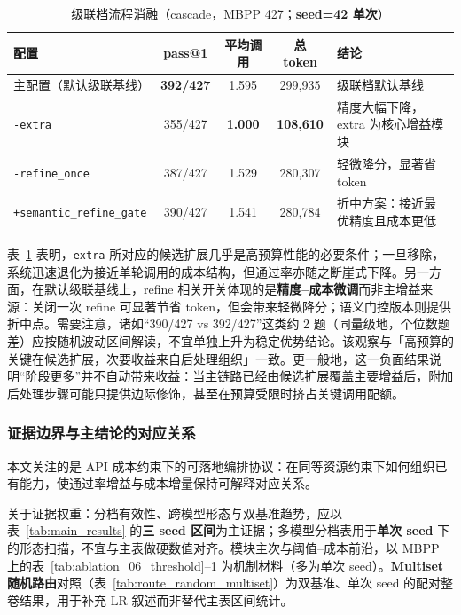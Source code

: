 \begin{table}[htbp]
\centering
\caption{级联档流程消融（cascade，MBPP 427；\textbf{seed=42 单次}）}
\label{tab:ablation_08_flow}
\begin{tabularx}{\textwidth}{p{3.8cm} c c c X}
\toprule
配置 & pass@1 & 平均调用 & 总 token & 结论 \\
\midrule
主配置（默认级联基线） & \textbf{392/427} & 1.595 & 299,935 & 级联档默认基线 \\
\texttt{-extra} & 355/427 & \textbf{1.000} & \textbf{108,610} & 精度大幅下降，extra 为核心增益模块 \\
\texttt{-refine\_once} & 387/427 & 1.529 & 280,307 & 轻微降分，显著省 token \\
\texttt{+semantic\_refine\_gate} & 390/427 & 1.541 & 280,784 & 折中方案：接近最优精度且成本更低 \\
\bottomrule
\end{tabularx}
\end{table}

表~\ref{tab:ablation_08_flow} 表明，\texttt{extra} 所对应的候选扩展几乎是高预算性能的必要条件；一旦移除，系统迅速退化为接近单轮调用的成本结构，但通过率亦随之断崖式下降。另一方面，在默认级联基线上，refine 相关开关体现的是\textbf{精度--成本微调}而非主增益来源：关闭一次 refine 可显著节省 token，但会带来轻微降分；语义门控版本则提供折中点。需要注意，诸如“390/427 vs 392/427”这类约 2 题（同量级地，个位数题差）应按随机波动区间解读，不宜单独上升为稳定优势结论。该观察与「高预算的关键在候选扩展，次要收益来自后处理组织」一致。更一般地，这一负面结果说明“阶段更多”并不自动带来收益：当主链路已经由候选扩展覆盖主要增益后，附加后处理步骤可能只提供边际修饰，甚至在预算受限时挤占关键调用配额。

\subsubsection{证据边界与主结论的对应关系}

本文关注的是 API 成本约束下的可落地编排协议：在同等资源约束下如何组织已有能力，使通过率增益与成本增量保持可解释对应关系。

关于证据权重：分档有效性、跨模型形态与双基准趋势，应以表~\ref{tab:main_results} 的\textbf{三 seed 区间}为主证据；多模型分档表用于\textbf{单次 seed} 下的形态扫描，不宜与主表做硬数值对齐。模块主次与阈值--成本前沿，以 MBPP 上的表~\ref{tab:ablation_06_threshold}--\ref{tab:ablation_08_flow} 为机制材料（多为单次 seed）。\textbf{Multiset 随机路由}对照（表~\ref{tab:route_random_multiset}）为双基准、单次 seed 的配对整卷结果，用于补充 LR 叙述而非替代主表区间统计。

